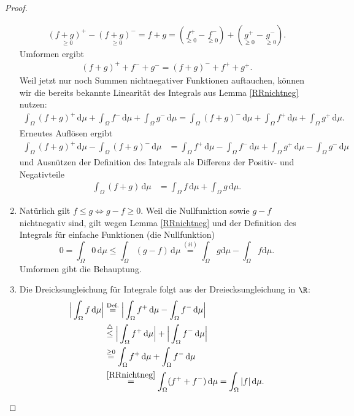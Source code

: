 \begin{proof}
\begin{enumerate}[label=(\roman*)]
		\begin{align*}
			\underset{\geq 0}{(f+g)^+} - \underset{\geq 0}{(f+g)^-} = f + g = (\underset{\geq 0}{f^+} - \underset{\geq 0}{f^-}) + (\underset{\geq 0}{g^+} - \underset{\geq 0}{g^-}).
		\end{align*}
		Umformen ergibt
		\begin{align*}
			 (f + g)^+ + f^- + g^- = (f + g)^- + f^+ + g^+.
		\end{align*}
		Weil jetzt nur noch Summen nichtnegativer Funktionen auftauchen, k\"onnen wir die bereits bekannte Linearit\"at des Integrals aus Lemma \ref{RRnichtneg} nutzen:
		\begin{align*}
			 \int_{\Omega} (f + g)^+\, \mathrm{d}\mu + \int_{\Omega} f^-\, \mathrm{d}\mu + \int_{\Omega} g^- \,\mathrm{d}\mu = \int_{\Omega} (f + g)^- \,\mathrm{d}\mu + \int_{\Omega} f^+ \,\mathrm{d}\mu + \int_{\Omega} g^+ \,\mathrm{d}\mu.
		\end{align*}
		Erneutes Auflösen ergibt 
		\begin{align*}
			\int_{\Omega} (f + g)^+ \,\mathrm{d}\mu - \int_{\Omega} (f + g)^- \,\mathrm{d}\mu &= \int_{\Omega} f^+ \,\mathrm{d}\mu - \int_{\Omega} f^- \,\mathrm{d}\mu + \int_{\Omega} g^+ \,\mathrm{d}\mu - \int_{\Omega} g^-\, \mathrm{d}\mu
		\end{align*}
		und Ausn\"utzen der Definition des Integrals als Differenz der Positiv- und Negativteile
		\begin{align*}	
			 \int_{\Omega} (f + g)\, \mathrm{d}\mu &= \int_{\Omega} f\, \mathrm{d}\mu + \int_{\Omega} g\, \mathrm{d}\mu.
		\end{align*}
		\item Nat\"urlich gilt $f \leq g \Leftrightarrow g - f \geq 0$. Weil die Nullfunktion sowie $g-f$ nichtnegativ sind, gilt wegen Lemma \ref{RRnichtneg} und der Definition des Integrals f\"ur einfache Funktionen (die Nullfunktion)
		\[ 0 = \int_{\Omega} 0 \,\mathrm{d}\mu \leq \int_{\Omega} (g-f)\, \mathrm{d}\mu \overset{(ii)}{=} \int_{\Omega} g \mathrm{d}\mu - \int_{\Omega} f \mathrm{d}\mu. \]
		Umformen gibt die Behauptung.
		\item Die Dreicksungleichung f\"ur Integrale folgt aus der Dreiecksungleichung in $\R$:
		\begin{align*}
			\Big|\int_{\Omega} f\, \mathrm{d}\mu\Big|& \overset{\text{Def.}}{=} \Big|\int_{\Omega} f^+ \,\mathrm{d}\mu - \int_{\Omega} f^- \,\mathrm{d}\mu\Big| \\
			&\overset{\triangle}{\leq} \Big|\int_{\Omega} f^+ \,\mathrm{d}\mu\Big| + \Big|\int_{\Omega} f^- \,\mathrm{d}\mu\Big|\\
			&\overset{\geq 0}{=} \int_{\Omega} f^+\, \mathrm{d}\mu + \int_{\Omega} f^- \,\mathrm{d}\mu\\
			& \overset{\ref{RRnichtneg}}{=} \int_{\Omega} (f^+ + f^- )\,\mathrm{d}\mu = \int_{\Omega} |f| \,\mathrm{d}\mu.
		\end{align*}
	\end{enumerate}
\end{proof}

